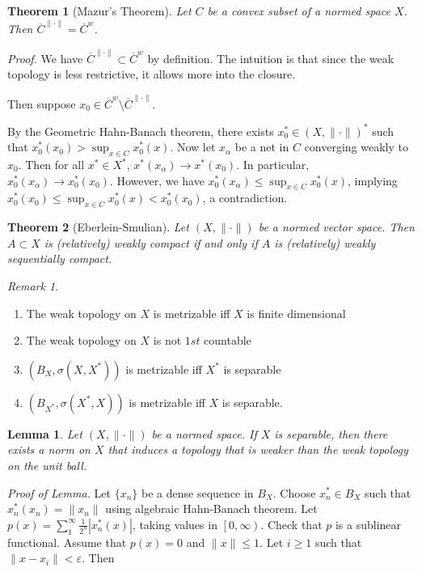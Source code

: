 \documentclass[11pt, reqno]{article}
\theoremstyle{plain}
\newtheorem*{theorem}{Theorem}
\newtheorem*{lemma}{Lemma}
\theoremstyle{definition}
\theoremstyle{remark}
\newtheorem*{remark}{Remark}
\renewcommand{\epsilon}{\varepsilon}
\begin{document}
\begin{theorem}[Mazur's Theorem]
    Let $C$ be a convex subset of a normed space $X$. Then $\overline{C}^{\|\cdot\|} = \overline{C}^w$.
\end{theorem}

\textit{Proof.} We have $\overline{C}^{\|\cdot\|} \subset \overline{C}^w$ by definition. The intuition is that
since the weak topology is less restrictive, it allows more into the closure. 

Then suppose $x_0 \in \overline{C}^w \setminus \overline{C}^{\|\cdot\|}$.

By the Geometric Hahn-Banach theorem, there exists $x_0^* \in (X, \|\cdot\|)^*$ such that 
$x_0^*(x_0) > \sup_{x \in C} x_0^*(x)$. Now let $x_\alpha$ be a net in $C$ converging weakly to $x_0$. 
Then for all $x^* \in X^*$, $x^*(x_\alpha) \rightarrow x^*(x_0)$. In particular, $x_0^*(x_\alpha)
\rightarrow x_0^*(x_0)$. However, we have $x_0^*(x_\alpha) \leq \sup_{x \in C} x_0^*(x)$,
implying $x_0^*(x_0) \leq \sup_{x \in C} x_0^*(x) < x_0^*(x_0)$, a contradiction. 

\begin{theorem}[Eberlein-Smulian]
    Let $(X, \|\cdot\|)$ be a normed vector space. Then $A \subset X$ is (relatively) weakly compact if and only if 
    $A$ is (relatively) weakly sequentially compact. 
\end{theorem}

\begin{remark}
    \begin{enumerate}
        \item The weak topology on $X$ is metrizable iff $X$ is finite dimensional
        \item The weak topology on $X$ is not $1st$ countable
        \item $(B_X, \sigma(X, X^*))$ is metrizable iff $X^*$ is separable
        \item $(B_{X^*}, \sigma(X^*, X))$ is metrizable iff $X$ is separable.
    \end{enumerate}
\end{remark}

\begin{lemma}
    Let $(X, \|\cdot\|)$ be a normed space. If $X$ is separable, then there exists a norm on $X$ that induces
    a topology that is weaker than the weak topology on the unit ball.
\end{lemma}

\textit{Proof of Lemma.} Let $\{x_n\}$ be a dense sequence in $B_X$. Choose $x_n^* \in B_X$ such that 
$x_n^*(x_n) = \|x_n\|$ using algebraic Hahn-Banach theorem. Let $p(x) = \sum_1^\infty \frac{1}{2^n}|x_n^*(x)|$,
taking values in $\left[0,\infty\right)$. Check that $p$ is a sublinear functional. Assume that $p(x) = 0$ 
and $\|x\| \leq 1$. Let $i \geq 1$ such that $\|x - x_i\| < \epsilon$. Then 
\end{document}
